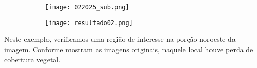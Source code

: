 \documentclass{article}
\begin{document}
\begin{figure}[H]
    \centering
    \begin{subfigure}[b]{0.48\textwidth}
        \texttt{[image: 022025\_sub.png]}
        \label{2023}
    \end{subfigure}
    \hfill %
    \begin{subfigure}[b]{0.48\textwidth}
        \texttt{[image: resultado02.png]}
        \label{2025}
    \end{subfigure}
    \label{resultado}
\end{figure}

Neste exemplo, verificamos uma região de interesse na porção noroeste da imagem. Conforme mostram as imagens originais, naquele local houve perda de cobertura vegetal.

\nocite{*}


\end{document}
